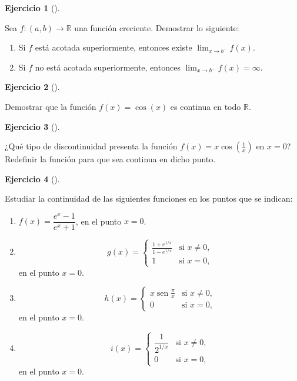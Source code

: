 \documentclass[
  a4paper,
]{scrreport}
\providecommand{\tightlist}{%
  \setlength{\itemsep}{0pt}\setlength{\parskip}{0pt}}\usepackage{longtable,booktabs,array}
\theoremstyle{definition}
\newtheorem{exercise}{Ejercicio}[chapter]
\theoremstyle{remark}
\begin{document}
\begin{exercise}[]\protect\hypertarget{exr-limites-funciones-acotadas}{}\label{exr-limites-funciones-acotadas}

Sea \(f:(a,b)\to \mathbb{R}\) una función creciente. Demostrar lo
siguiente:

\begin{enumerate}
\def\labelenumi{\alph{enumi}.}
\tightlist
\item
  Si \(f\) está acotada superiormente, entonces existe
  \(\lim_{x\to b^-}f(x)\).
\item
  Si \(f\) no está acotada superiormente, entonces
  \(\lim_{x\to b^-}f(x)=\infty\).
\end{enumerate}

\end{exercise}

\begin{exercise}[]\protect\hypertarget{exr-continuidad-coseno}{}\label{exr-continuidad-coseno}

Demostrar que la función \(f(x)=\cos(x)\) es continua en todo
\(\mathbb{R}\).

\end{exercise}

\begin{exercise}[]\protect\hypertarget{exr-discontinuidad-evitable}{}\label{exr-discontinuidad-evitable}

¿Qué tipo de discontinuidad presenta la función
\(f(x)=x\cos\left(\frac{1}{x}\right)\) en \(x=0\)? Redefinir la función
para que sea continua en dicho punto.

\end{exercise}

\begin{exercise}[]\protect\hypertarget{exr-clasificacion-dicontinuidades}{}\label{exr-clasificacion-dicontinuidades}

Estudiar la continuidad de las siguientes funciones en los puntos que se
indican:

\begin{enumerate}
\def\labelenumi{\alph{enumi}.}
\item
  \(f(x)=\dfrac{e^x-1}{e^x+1}\), en el punto \(x=0\).
\item
  \[
  g(x)=
  \begin{cases}
  \frac{1+e^{1/x}}{1-e^{1/x}} & \mbox{si $x\neq 0$,} \\
  1 &  \mbox{si $x=0$,}
  \end{cases}
  \] en el punto \(x=0\).
\item
  \[
  h(x)=
  \begin{cases}
  x\operatorname{sen}\frac{\pi}{x} & \mbox{si $x\neq 0$,} \\
  0 & \mbox{si $x=0$,}
  \end{cases}
  \] en el punto \(x=0\).
\item
  \[
  i(x)=
  \begin{cases}
  \dfrac{1}{2^{1/x}} &  \mbox{si $x\neq 0$,} \\
  0 & \mbox{si $x=0$,}
  \end{cases}
  \] en el punto \(x=0\).
\end{enumerate}

\end{exercise}
\end{document}
